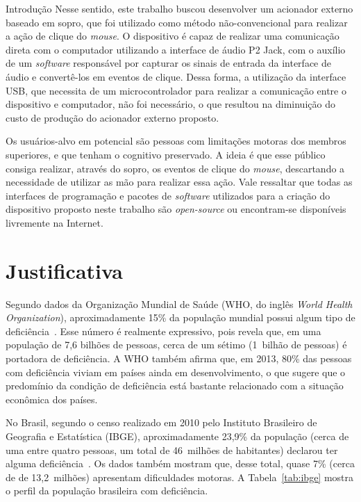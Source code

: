 \begin{chapter}{Introdução}
Nesse sentido, este trabalho buscou desenvolver um acionador externo baseado em
sopro, que foi utilizado como método não-convencional para realizar a ação de
clique do \textit{mouse}. O dispositivo é capaz de realizar uma comunicação
direta com o computador utilizando a interface de áudio P2 Jack, com o auxílio
de um \textit{software} responsável por capturar os sinais de entrada da
interface de áudio e convertê-los em eventos de clique. Dessa forma, a
utilização da interface USB, que necessita de um microcontrolador para realizar
a comunicação entre o dispositivo e computador, não foi necessário, o que
resultou na diminuição do custo de produção do acionador externo proposto. 

Os usuários-alvo em potencial são pessoas com limitações motoras dos membros
superiores, e que tenham o cognitivo preservado. A ideia é que esse público
consiga realizar, através do sopro, os eventos de clique do \textit{mouse},
descartando a necessidade de utilizar as mão para realizar essa ação. Vale
ressaltar que todas as interfaces de programação e pacotes de \textit{software}
utilizados para a criação do dispositivo proposto neste trabalho são
\textit{open-source} ou encontram-se disponíveis livremente na Internet.

\section{Justificativa}

Segundo dados da Organização Mundial de Saúde (WHO, do inglês \textit{World
Health Organization}), aproximadamente 15\% da população mundial possui algum
tipo de deficiência~\cite{WHO15}. Esse número é realmente expressivo, pois
revela que, em uma população de 7,6 bilhões de pessoas, cerca de um sétimo
(1~bilhão de pessoas) é portadora de deficiência. A WHO também afirma que,
em 2013, 80\% das pessoas com deficiência viviam em países ainda em
desenvolvimento, o que sugere que o predomínio da condição de deficiência está
bastante relacionado com a situação econômica dos países.
  
No Brasil, segundo o censo realizado em 2010 pelo Instituto Brasileiro de
Geografia e Estatística (IBGE), aproximadamente 23,9\% da população (cerca de
uma entre quatro pessoas, um total de 46~milhões de habitantes) declarou ter
alguma deficiência~\cite{tIBGE}. Os dados também mostram que, desse total, quase
7\% (cerca de de 13,2~milhões) apresentam dificuldades motoras. A
Tabela~\ref{tab:ibge} mostra o perfil da população brasileira com deficiência.


\end{chapter}
